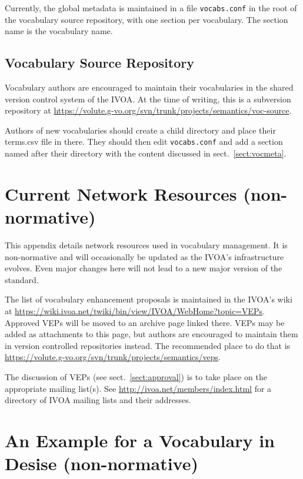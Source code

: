 \documentclass[11pt,a4paper]{ivoa}
\begin{document}
Currently, the global metadata is maintained in a file
\verb|vocabs.conf| in the root of the vocabulary source repository, with one
section per vocabulary.  The section name is the vocabulary name.

\subsection{Vocabulary Source Repository}

Vocabulary authors are encouraged to maintain their vocabularies in the
shared version control system of the IVOA.  At the time of writing, this
is a subversion repository at
\url{https://volute.g-vo.org/svn/trunk/projects/semantics/voc-source}.

Authors of new vocabularies should create a child directory and place
their terms.csv file in there.  They should then edit \verb|vocabs.conf|
and add a section named after their directory with the content discussed
in sect.~\ref{sect:vocmeta}.


\section{Current Network Resources (non-normative)}
\label{app:curtech}

This appendix details network resources used in vocabulary management.
It is non-normative and will occasionally be updated as the IVOA's
infrastructure evolves.  Even major changes here will not lead to a new
major version of the standard.

The list of vocabulary enhancement proposals is maintained in the IVOA's
wiki at
\url{https://wiki.ivoa.net/twiki/bin/view/IVOA/WebHome?topic=VEPs}.
Approved VEPs will be moved to an archive page linked there.
VEPs may be added as attachments to this page, but authors are
encouraged to maintain them in version controlled repositories instead.
The recommended place to do that is
\url{https://volute.g-vo.org/svn/trunk/projects/semantics/veps}.

The discussion of VEPs (see sect.~\ref{sect:approval}) is to take place
on the appropriate  mailing list(s).  See
\url{http://ivoa.net/members/index.html} for a directory of IVOA mailing
lists and their addresses.

\section{An Example for a Vocabulary in Desise (non-normative)}
\label{app:desiseexample}
\end{document}

